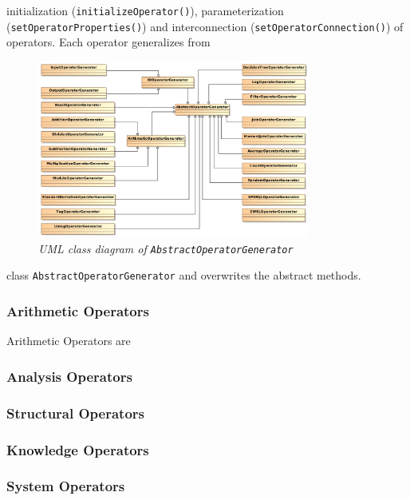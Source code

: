 initialization (\texttt{initializeOperator()}), parameterization 
(\texttt{setOperatorProperties()}) and interconnection 
(\texttt{setOperatorConnection()}) of operators. Each operator generalizes from
\begin{figure}[htpb]
  \centering
  \includegraphics[width=0.8\textwidth]{figures/overview}
  \caption{\emph{UML class diagram of \texttt{AbstractOperatorGenerator}}}
  \label{fig:abstractoperatorgenerator}
\end{figure}
class \texttt{AbstractOperatorGenerator} and overwrites the abstract methods.

\subsubsection{Arithmetic Operators}
Arithmetic Operators are 

\subsubsection{Analysis Operators}

\subsubsection{Structural Operators}

\subsubsection{Knowledge Operators}

\subsubsection{System Operators}
